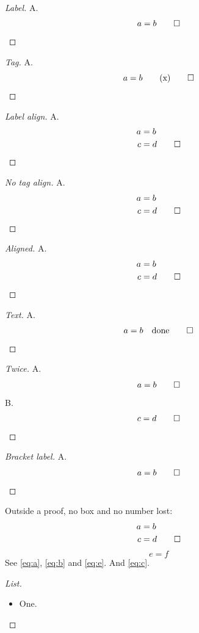 \documentclass{article}
\begin{document}
\begin{proof}[Label]
A.
\begin{equation}\label{eq:a} a = b \qedhere \end{equation}
\end{proof}
\begin{proof}[Tag]
A.
\begin{equation*} a = b \tag{x} \qedhere \end{equation*}
\end{proof}
\begin{proof}[Label align]
A.
\begin{align} a &= b \\ c &= d \label{eq:b} \qedhere \end{align}
\end{proof}
\begin{proof}[No tag align]
A.
\begin{align} a &= b \\ c &= d \notag \qedhere \end{align}
\end{proof}
\begin{proof}[Aligned]
A.
\[ \begin{aligned} a &= b \\ c &= d \qedhere \end{aligned} \]
\end{proof}
\begin{proof}[Text]
A.
\[ a = b \quad \text{done} \qedhere \]
\end{proof}
\begin{proof}[Twice]
A.
\[ a = b \qedhere \]
B.
\[ c = d \qedhere \]
\end{proof}
\begin{proof}[Bracket label]
A.
\[ a = b \label{eq:c} \qedhere \]
\end{proof}
Outside a proof, no box and no number lost:
\begin{align} a &= b \\ c &= d \qedhere \end{align}
\begin{equation}\label{eq:e} e = f \end{equation}
See \eqref{eq:a}, \eqref{eq:b} and \eqref{eq:e}. And \ref{eq:c}.
\begin{proof}[List]
\begin{itemize}\item One.\end{itemize}
\end{proof}
\end{document}
